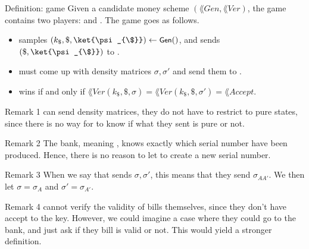 \documentclass[a4paper]{article}
\begin{document}
\begin{parag}{Definition:  game}
    Given a candidate money scheme $\left(\lang{Gen}, \lang{Ver}\right)$, the game  contains two players:  and . The game goes as follows.
    \begin{itemize}
        \item {} samples $\left(k_{\$}, \$, \ket{\psi_{\$}}\right) \leftarrow \lang{Gen}\left(\right)$, and sends $\left(\$, \ket{\psi_{\$}}\right)$ to .
        \item {} must come up with density matrices $\sigma, \sigma'$ and send them to .
        \item {} wins if and only if $\lang{Ver}\left(k_{\$}, \$, \sigma\right) = \lang{Ver}\left(k_{\$}, \$, \sigma'\right) = \lang{Accept}$.
    \end{itemize}
    
    \begin{subparag}{Remark 1}
         can send density matrices, they do not have to restrict to pure states, since there is no way for  to know if what they sent is pure or not.
    \end{subparag}

    \begin{subparag}{Remark 2}
        The bank, meaning , knows exactly which serial number have been produced. Hence, there is no reason to let  to create a new serial number.
    \end{subparag}

    \begin{subparag}{Remark 3}
        When we say that  sends $\sigma, \sigma'$, this means that they send $\sigma_{A A'}$. We then let $\sigma = \sigma_A$ and $\sigma' = \sigma_{A'}$.
    \end{subparag}

    \begin{subparag}{Remark 4}
         cannot verify the validity of bills themselves, since they don't have accept to the key. However, we could imagine a case where they could go to the bank, and just ask if they bill is valid or not. This would yield a stronger definition. 
    \end{subparag}
\end{parag}
\end{document}
